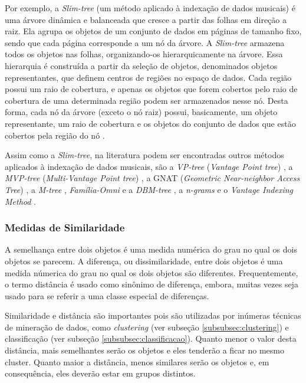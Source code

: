 Por exemplo, a \textit{Slim-tree} (um método aplicado à indexação de dados musicais) é uma árvore dinâmica e balanceada que cresce a partir das folhas em direção a raiz. Ela agrupa os objetos de um conjunto de dados em páginas de tamanho fixo, sendo que cada página corresponde a um nó da árvore. A \textit{Slim-tree} armazena todos os objetos nas folhas, organizando-os hierarquicamente na árvore. Essa hierarquia é construída a partir da seleção de objetos, denominados objetos representantes, que definem centros de regiões no espaço de dados. Cada região possui um raio de cobertura, e apenas os objetos que forem cobertos pelo raio de cobertura de uma determinada região podem ser armazenados nesse nó. Desta forma, cada nó da árvore
(exceto o nó raiz) possui, basicamente, um objeto representante, um raio de cobertura e os objetos do conjunto de dados que estão cobertos pela região do nó \cite{traina2000}.

Assim como a \textit{Slim-tree}, na literatura podem ser encontradas outros métodos aplicados à indexação de dados musicais, são a \textit{VP-tree} (\textit{Vantage Point tree}) \cite{yanilos1993}, a \textit{MVP-tree} (\textit{Multi-Vantage Point tree}) \cite{bozkaya1997}, a GNAT (\textit{Geometric Near-neighbor Access Tree}) \cite{brin1995}, a \textit{M-tree} \cite{ciaccia1997}, \textit{Família-Omni} e a \textit{DBM-tree} \cite{filho2001, vieira2004}, a \textit{n-grams} \cite{downie1999} e o \textit{Vantage Indexing Method} \cite{typke2003}.

\subsubsection{Medidas de Similaridade} \label{subsubsec:medidas-similaridade}
A semelhança entre dois objetos é uma medida numérica do grau no qual os dois objetos se parecem. A diferença, ou dissimilaridade, entre dois objetos é uma medida númerica do grau no qual os dois objetos são diferentes. Frequentemente, o termo distância é usado como sinônimo de diferença, embora, muitas vezes seja usado para se referir a uma classe especial de diferenças.

Similaridade e distância são importantes pois são utilizadas por inúmeras técnicas de mineração de dados, como \textit{clustering} (ver subseção \ref{subsubsec:clustering}) e classificação (ver subseção \ref{subsubsec:classificacao}). Quanto menor o valor desta distância, mais semelhantes serão os objetos e eles tenderão a ficar no mesmo cluster. Quanto maior a distância, menos similares serão os objetos e, em consequência, eles deverão estar em grupos distintos.

